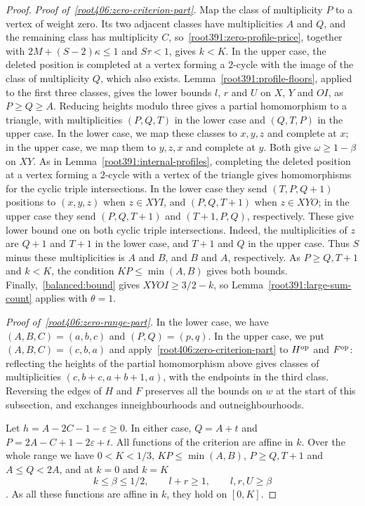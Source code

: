 \begin{proof}
\emph{Proof of~\ref{root406:zero-criterion-part}.} Map the class of multiplicity $P$ to a vertex of weight zero. Its two adjacent classes have multiplicities $A$ and $Q$, and the remaining class has multiplicity $C$, so~\eqref{root391:zero-profile-price}, together with $2M+(S-2)\kappa\le1$ and $S\tau<1$, gives $k<K$. In the upper case, the deleted position is completed at a vertex forming a $2$-cycle with the image of the class of multiplicity $Q$, which also exists.
Lemma~\ref{root391:profile-floors}, applied to the first three classes, gives the lower bounds $l$, $r$ and $U$ on $X$, $Y$ and $OI$, as $P\ge Q\ge A$.
Reducing heights modulo three gives a partial homomorphism to a triangle, with multiplicities $(P,Q,T)$ in the lower case and $(Q,T,P)$ in the upper case. In the lower case, we map these classes to $x,y,z$ and
complete at $x$; in the upper case, we map them to $y,z,x$ and
complete at $y$. Both give $\omega\ge1-\beta$ on $XY$.
As in Lemma~\ref{root391:internal-profiles}, completing the deleted position at a vertex forming a $2$-cycle with a vertex of the triangle gives homomorphisms for the cyclic triple intersections. In the lower case they send $(T,P,Q+1)$ positions to $(x,y,z)$ when $z\in XYI$, and $(P,Q,T+1)$ when $z\in XYO$; in the upper case they send $(P,Q,T+1)$ and $(T+1,P,Q)$, respectively.
These give lower bound one on both cyclic triple intersections. Indeed, the multiplicities of $z$ are $Q+1$ and $T+1$ in the lower case, and $T+1$ and $Q$ in the upper case. Thus $S$ minus these multiplicities
is $A$ and $B$, and $B$ and $A$, respectively. As $P\ge Q,T+1$ and $k<K$, the condition $KP\le\min(A,B)$ gives both bounds. Finally,~\eqref{balanced:bound} gives
$XYOI\ge3/2-k$, so
Lemma~\ref{root391:large-sum-count} applies with $\theta=1$.

\emph{Proof of~\ref{root406:zero-range-part}.} In the lower case, we have $(A,B,C)=(a,b,c)$ and
$(P,Q)=(p,q)$. In the upper case, we put $(A,B,C)=(c,b,a)$ and apply~\ref{root406:zero-criterion-part}
to $H^{\rm op}$ and $F^{\rm op}$: reflecting the heights of the partial homomorphism above gives classes of multiplicities
$(c,b+c,a+b+1,a)$, with the endpoints in the third class. Reversing the edges of $H$ and $F$ preserves all the bounds on $w$ at the start of this subsection, and exchanges inneighbourhoods and outneighbourhoods.

Let $h=A-2C-1-\varepsilon\ge0$. In either case,
$Q=A+t$ and $P=2A-C+1-2\varepsilon+t$. All functions of the criterion
are affine in $k$. Over the whole range we have $0<K<1/3$,
$KP\le\min(A,B)$, $P\ge Q,T+1$ and $A\le Q<2A$, and at $k=0$ and $k=K$
\[
 k\le\beta\le1/2,\qquad l+r\ge1,\qquad l,r,U\ge\beta
\]
. As all these functions are affine in $k$, they hold on $[0,K]$.
\end{proof}


